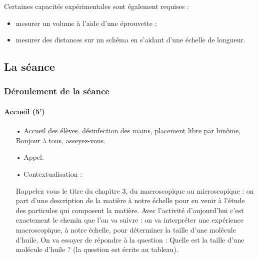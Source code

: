 \documentclass[12pt,a4paper]{article}
\begin{document}
Certaines capacités expérimentales sont également requises :
\begin{itemize}
\item mesurer un volume à l'aide d'une éprouvette ;
\item mesurer des distances sur un schéma en s'aidant d'une échelle de longueur.
\end{itemize}

\subsection{La séance}

\subsubsection{Déroulement de la séance}

\paragraph{Accueil (5')}
\begin{itemize}
\item[•] Accueil des élèves, désinfection des mains, placement libre par binôme, \og Bonjour à tous, asseyez-vous. \fg{}
\item[•] Appel.
\item[•] Contextualisation : 

\og Rappelez vous le titre du chapitre 3, du macroscopique au microscopique : on part d'une description de la matière à notre échelle pour en venir à l'étude des particules qui composent la matière.
Avec l'activité d'aujourd'hui c'est exactement le chemin que l'on va suivre : on va interpréter une expérience macroscopique, à notre échelle, pour déterminer la taille d'une molécule d'huile.
On va essayer de répondre à la question : Quelle est la taille d'une molécule d'huile ?\fg{}
(la question est écrite au tableau).
\end{itemize}
\end{document}
